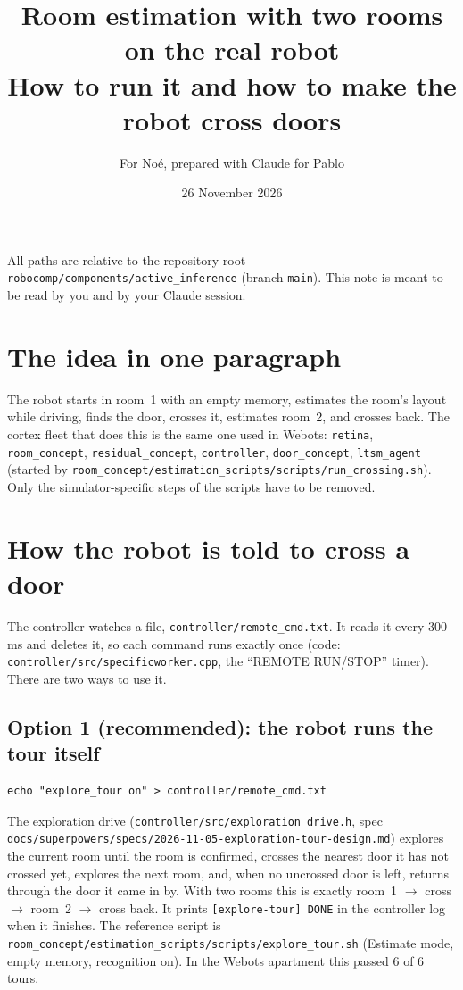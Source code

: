 \documentclass[11pt,a4paper]{article}
\title{Room estimation with two rooms on the real robot\\[2pt]\large How to run it and how to make the robot cross doors}
\author{For Noé, prepared with Claude for Pablo}
\date{26 November 2026}
\newcommand{\f}[1]{\texttt{#1}}
\begin{document}
\maketitle

\noindent All paths are relative to the repository root \f{robocomp/\allowbreak{}components/\allowbreak{}active\_\allowbreak{}inference}
(branch \f{main}). This note is meant to be read by you and by your Claude session.

\section{The idea in one paragraph}
The robot starts in room~1 with an empty memory, estimates the room's layout while driving, finds the door, crosses
it, estimates room~2, and crosses back. The cortex fleet that does this is the same one used in Webots:
\f{retina}, \f{room\_\allowbreak{}concept}, \f{residual\_\allowbreak{}concept}, \f{controller}, \f{door\_\allowbreak{}concept}, \f{ltsm\_\allowbreak{}agent}
(started by \f{room\_\allowbreak{}concept/\allowbreak{}estimation\_\allowbreak{}scripts/\allowbreak{}scripts/\allowbreak{}run\_\allowbreak{}crossing.sh}). Only the simulator-specific steps of the
scripts have to be removed.

\section{How the robot is told to cross a door}
The controller watches a file, \f{controller/\allowbreak{}remote\_\allowbreak{}cmd.txt}. It reads it every 300\,ms and deletes it, so each command
runs exactly once (code: \f{controller/\allowbreak{}src/\allowbreak{}specificworker.cpp}, the ``REMOTE RUN/STOP'' timer). There are two ways to
use it.

\subsection*{Option 1 (recommended): the robot runs the tour itself}
\begin{lstlisting}
echo "explore_tour on" > controller/remote_cmd.txt
\end{lstlisting}
The exploration drive (\f{controller/\allowbreak{}src/\allowbreak{}exploration\_\allowbreak{}drive.h}, spec
\f{docs/\allowbreak{}superpowers/\allowbreak{}specs/\allowbreak{}2026-11-05-exploration-tour-design.md}) explores the current room until the room is
confirmed, crosses the nearest door it has not crossed yet, explores the next room, and, when no uncrossed door is left,
returns through the door it came in by. With two rooms this is exactly room~1 $\to$ cross $\to$ room~2 $\to$ cross back.
It prints \f{[explore-tour] DONE} in the controller log when it finishes. The reference script is
\f{room\_\allowbreak{}concept/\allowbreak{}estimation\_\allowbreak{}scripts/\allowbreak{}scripts/\allowbreak{}explore\_\allowbreak{}tour.sh} (Estimate mode, empty memory, recognition on).
In the Webots apartment this passed 6 of 6 tours.
\end{document}
